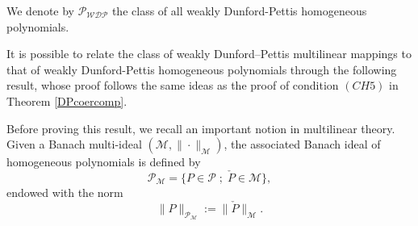 \documentclass[12 pt]{article}%
\newtheorem{proposition}[theorem]{Proposition}
\newtheorem{final remark}[theorem]{Final Remark}
\begin{document}
%
%	
%	
%

We denote by $\mathcal{P_{WDP}}$ the class of all weakly Dunford-Pettis homogeneous polynomials.

It is possible to relate the class of weakly Dunford--Pettis multilinear mappings to that of weakly Dunford-Pettis homogeneous polynomials through the following result, whose proof follows the same ideas as the proof of condition $(CH5)$ in Theorem \ref{DPcoercomp}.

Before proving this result, we recall an important notion in multilinear theory. Given a Banach multi-ideal $(\mathcal{M}, \|\cdot\|_{\mathcal{M}})$, the associated Banach ideal of homogeneous polynomials is defined by
\begin{equation*}
	\mathcal{P}_{\mathcal{M}} = \{P \in \mathcal{P} \; ; \; \check{P} \in \mathcal{M}\},
\end{equation*}
endowed with the norm
\begin{equation*}
	\|P\|_{\mathcal{P}_{\mathcal{M}}} := \|\check{P}\|_{\mathcal{M}}.
\end{equation*}
\end{document}
